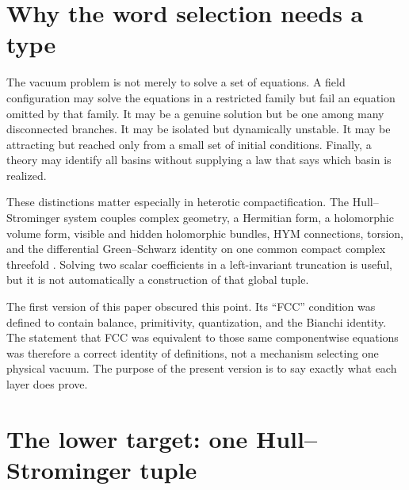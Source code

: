 \documentclass[11pt]{article}
\numberwithin{equation}{section}
\theoremstyle{definition}
\theoremstyle{plain}
\theoremstyle{remark}
\begin{document}
\tableofcontents

\section{Why the word selection needs a type}

The vacuum problem is not merely to solve a set of equations.  A field
configuration may solve the equations in a restricted family but fail an
equation omitted by that family.  It may be a genuine solution but be one
among many disconnected branches.  It may be isolated but dynamically
unstable.  It may be attracting but reached only from a small set of initial
conditions.  Finally, a theory may identify all basins without supplying a
law that says which basin is realized.

These distinctions matter especially in heterotic compactification.  The
Hull--Strominger system couples complex geometry, a Hermitian form, a
holomorphic volume form, visible and hidden holomorphic bundles, HYM
connections, torsion, and the differential Green--Schwarz identity on one
common compact complex threefold
\cite{Strominger1986,Hull1986,DelaOssaSvanes2014}.  Solving two scalar
coefficients in a left-invariant truncation is useful, but it is not
automatically a construction of that global tuple.

The first version of this paper obscured this point.  Its ``FCC'' condition
was defined to contain balance, primitivity, quantization, and the Bianchi
identity.  The statement that FCC was equivalent to those same
componentwise equations was therefore a correct identity of definitions, not
a mechanism selecting one physical vacuum.  The purpose of the present
version is to say exactly what each layer does prove.

\section{The lower target: one Hull--Strominger tuple}
\end{document}
